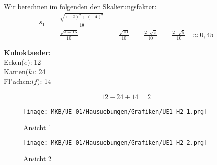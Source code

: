 \begin{Loesung}
\begin{Teilloesungen}
\item Wir berechnen im folgenden den Skalierungsfaktor:
\begin{align*}
s_1 &= \frac{\sqrt{(-2)^{2}+(-4)^{2}}}{10}\\
&= \frac{\sqrt{4+16}}{10}
&= \frac{\sqrt{20}}{10}
&= \frac{2 \cdot \sqrt{5}}{10}
&= \frac{2 \cdot \sqrt{5}}{10}
&\approx 0,45
\end{align*}

\item \textbf{Kuboktaeder:} \\
Ecken($e$): 12\\
Kanten($k$): 24\\
Fl"achen:($f$): 14\\

\item \begin{align*}
12 - 24 + 14 = 2
\end{align*}

\item \begin{figure}[H]
	\centering
	\texttt{[image: MKB/UE\_01/Hausuebungen/Grafiken/UE1\_H2\_1.png]}
	\caption{Ansicht 1}
	\label{fig:H2_1}
\end{figure}

\item \begin{figure}[H]
	\centering
	\texttt{[image: MKB/UE\_01/Hausuebungen/Grafiken/UE1\_H2\_2.png]}
	\caption{Ansicht 2}
	\label{fig:H2_2}
\end{figure}
\end{Teilloesungen}
\end{Loesung}

